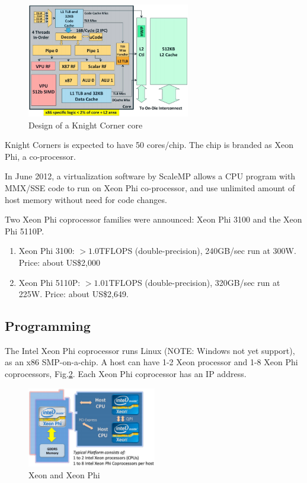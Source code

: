  \begin{figure}[hbt]
  \centerline{\includegraphics[height=5cm,
    angle=0]{./images/Knight_Corner_core.eps}}
  \caption{Design of a Knight Corner core}
  \label{fig:Knight_Corner_core}
\end{figure}

Knight Corners is expected to have 50 cores/chip. The chip is branded as Xeon
Phi, a co-processor. 

In June 2012, a virtualization software by ScaleMP allows a CPU program with
MMX/SSE code to run on Xeon Phi co-processor, and use unlimited amount of host
memory without need for code changes.

Two Xeon Phi coprocessor families were announced: Xeon Phi 3100 and the Xeon Phi
5110P. 
\begin{enumerate}
  \item Xeon Phi 3100: $>1.0$TFLOPS (double-precision), 240GB/sec run at 300W.
  Price: about US\$2,000
  \item Xeon Phi 5110P: $>1.01$TFLOPS (double-precision), 320GB/sec run at 225W.
  Price: about US\$2,649.
\end{enumerate}
  
 \subsection{Programming}
 
 The Intel Xeon Phi coprocessor runs Linux (NOTE: Windows not yet support), as
 an x86 SMP-on-a-chip.  A host can have 1-2 Xeon processor and 1-8 Xeon Phi
 coprocessors, Fig.\ref{fig:Xeon_Phi}.
 Each Xeon Phi coprocessor has an IP address.
 
 \begin{figure}[hbt]
  \centerline{\includegraphics[height=3.5cm,
    angle=0]{./images/Xeon_Phi.eps}}
  \caption{Xeon and Xeon Phi}
  \label{fig:Xeon_Phi}
\end{figure}

